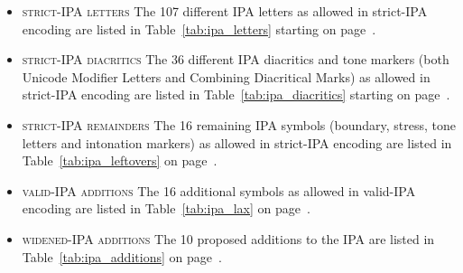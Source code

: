 \begin{itemize}[itemsep=6pt]

  \item \textsc{strict-IPA letters} \newline
        The 107 different IPA letters as allowed in strict-IPA encoding are
        listed in Table~\ref{tab:ipa_letters} starting on
        page~\pageref{tab:ipa_letters}.
  \item \textsc{strict-IPA diacritics} \newline The 36 different IPA diacritics and
        tone markers (both Unicode Modifier Letters and Combining Diacritical
        Marks) as allowed in strict-IPA encoding are listed in
        Table~\ref{tab:ipa_diacritics} starting on
        page~\pageref{tab:ipa_diacritics}.
  \item \textsc{strict-IPA remainders} \newline The 16 remaining IPA symbols
        (boundary, stress, tone letters and intonation markers) as allowed in strict-IPA
        encoding are listed in Table~\ref{tab:ipa_leftovers} on
        page~\pageref{tab:ipa_leftovers}.
  \item \textsc{valid-IPA additions} \newline The 16 additional symbols as allowed in
        valid-IPA encoding are listed in Table~\ref{tab:ipa_lax} on
        page~\pageref{tab:ipa_lax}.     
  \item \textsc{widened-IPA additions} \newline
        The 10 proposed additions to the IPA are listed in
        Table~\ref{tab:ipa_additions} on page~\pageref{tab:ipa_additions}.
  
\end{itemize}

\newpage





